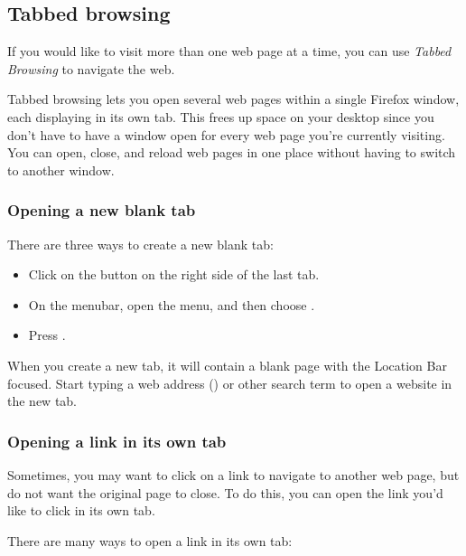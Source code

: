 \subsection{Tabbed browsing}

If you would like to visit more than one web page at a time, you can use 
\emph{Tabbed Browsing} to navigate the web.

Tabbed browsing lets you open several web pages within a single Firefox 
window, each displaying in its own tab. This frees up space on your 
desktop since you don't have to have a window open for every web page 
you're currently visiting. You can open, close, and reload web pages 
in one place without having to switch to another window.

\subsubsection{Opening a new blank tab}

There are three ways to create a new blank tab:

\begin{itemize}
  \item Click on the  button on the right side of the last tab.
  \item On the menubar, open the  menu, and then choose 
.
  \item Press .
\end{itemize}

When you create a new tab, it will contain a blank page with the Location Bar 
focused. Start typing a web address () or other search term to open a 
website in the new tab.

\subsubsection{Opening a link in its own tab}

Sometimes, you may want to click on a link to navigate to another web page,
but do not want the original page to close. To do this, you can open the 
link you'd like to click in its own tab.

There are many ways to open a link in its own tab:

